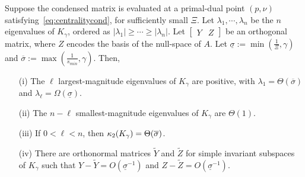 \begin{theorem}
  \label{thm:cond}
  Suppose the condensed matrix is evaluated at a primal-dual
  point $(p, \nu)$ satisfying~\eqref{eq:centralitycond},
  for sufficiently small $\Xi$.
  Let $\lambda_1, \cdots, \lambda_n$ be the $n$ eigenvalues of
  $K_\gamma$, ordered as $|\lambda_1| \geq  \cdots \geq |\lambda_n|$.
  Let $\begin{bmatrix} Y & Z \end{bmatrix}$ be an orthogonal
  matrix, where $Z$ encodes the basis of the null-space of
  $A$. Let $\underline{\sigma} :=\min\left(\frac{1}{\Xi}, \gamma\right)$
  and $\overline{\sigma} := \max\left(\frac{1}{s_{min}}, \gamma\right)$.
  Then,
  \begin{enumerate}
    \item[(i)] The $\ell$ largest-magnitude eigenvalues of $K_\gamma$ are positive,
      with $\lambda_1 = \Theta(\overline{\sigma})$ and $\lambda_{\ell} = \Omega(\underline{\sigma})$.
    \item[(ii)] The $n-\ell$ smallest-magnitude eigenvalues of $K_\gamma$
      are $\Theta(1)$.
    \item[(iii)] If $0 < \ell < n$, then $\kappa_2(K_\gamma) = \Theta(\overline{\sigma})$.
    \item[(iv)] There are orthonormal matrices $\widetilde{Y}$ and $\widetilde{Z}$ for
      simple invariant subspaces of $K_\gamma$ such that $Y - \widetilde{Y} = O(\underline{\sigma}^{-1})$
      and $Z - \widetilde{Z} = O(\underline{\sigma}^{-1})$.
  \end{enumerate}
\end{theorem}
